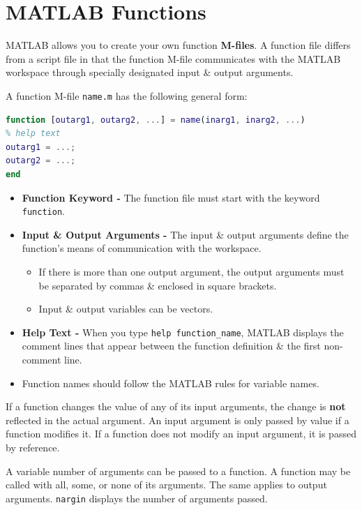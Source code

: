 \documentclass[11pt]{article}
\begin{document}
\section{MATLAB Functions} 
MATLAB allows you to create your own function \textbf{M-files}. 
A function file differs from a script file in that the function M-file communicates with the MATLAB workspace through 
specially designated input \& output arguments. 

A function M-file \verb|name.m| has the following general form:
\begin{lstlisting}[language=MATLAB]
function [outarg1, outarg2, ...] = name(inarg1, inarg2, ...)
% help text
outarg1 = ...;
outarg2 = ...; 
end 
\end{lstlisting}

\begin{itemize}
    \item   \textbf{Function Keyword -} The function file must start with the keyword \verb|function|. 
    \item   \textbf{Input \& Output Arguments -} The input \& output arguments define the function's means of communication with the workspace. 
        \begin{itemize}
            \item   If there is more than one output argument, the output arguments must be separated by commas \& enclosed in square brackets. 
            \item   Input \& output variables can be vectors.
        \end{itemize}
    \item   \textbf{Help Text -} When you type \verb|help function_name|, MATLAB displays the comment lines that appear between the function definition \& the first non-comment line.
    \item   Function names should follow the MATLAB rules for variable names. 
\end{itemize}
    
If a function changes the value of any of its input arguments, the change is \textbf{not} reflected in the actual argument. 
An input argument is only passed by value if a function modifies it. 
If a function does not modify an input argument, it is passed by reference. 

A variable number of arguments can be passed to a function. 
A function may be called with all, some, or none of its arguments. 
The same applies to output arguments. 
\verb|nargin| displays the number of arguments passed. 
\end{document}
